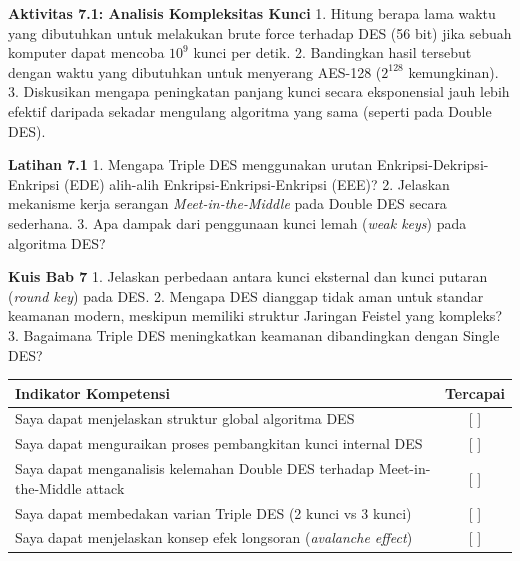 \documentclass[../main.tex]{subfiles}
\begin{document}
\begin{obeactivity}
\textbf{Aktivitas 7.1: Analisis Kompleksitas Kunci}
1. Hitung berapa lama waktu yang dibutuhkan untuk melakukan brute force terhadap DES (56 bit) jika sebuah komputer dapat mencoba $10^9$ kunci per detik.
2. Bandingkan hasil tersebut dengan waktu yang dibutuhkan untuk menyerang AES-128 ($2^{128}$ kemungkinan).
3. Diskusikan mengapa peningkatan panjang kunci secara eksponensial jauh lebih efektif daripada sekadar mengulang algoritma yang sama (seperti pada Double DES).
\end{obeactivity}

\begin{obereflection}
\textbf{Latihan 7.1}
1. Mengapa Triple DES menggunakan urutan Enkripsi-Dekripsi-Enkripsi (EDE) alih-alih Enkripsi-Enkripsi-Enkripsi (EEE)?
2. Jelaskan mekanisme kerja serangan \textit{Meet-in-the-Middle} pada Double DES secara sederhana.
3. Apa dampak dari penggunaan kunci lemah (\textit{weak keys}) pada algoritma DES?
\end{obereflection}

\begin{obeassessment}
\textbf{Kuis Bab 7}
1. Jelaskan perbedaan antara kunci eksternal dan kunci putaran (\textit{round key}) pada DES.
2. Mengapa DES dianggap tidak aman untuk standar keamanan modern, meskipun memiliki struktur Jaringan Feistel yang kompleks?
3. Bagaimana Triple DES meningkatkan keamanan dibandingkan dengan Single DES?
\end{obeassessment}

\begin{competencychecklist}
\begin{tabularx}{\linewidth}{|X|c|}
\hline
Indikator Kompetensi & Tercapai \\
\hline
Saya dapat menjelaskan struktur global algoritma DES & [ ] \\
\hline
Saya dapat menguraikan proses pembangkitan kunci internal DES & [ ] \\
\hline
Saya dapat menganalisis kelemahan Double DES terhadap Meet-in-the-Middle attack & [ ] \\
\hline
Saya dapat membedakan varian Triple DES (2 kunci vs 3 kunci) & [ ] \\
\hline
Saya dapat menjelaskan konsep efek longsoran (\textit{avalanche effect}) & [ ] \\
\hline
\end{tabularx}
\end{competencychecklist}
\end{document}
